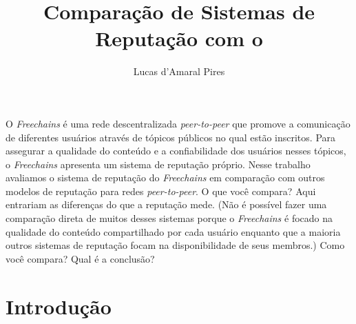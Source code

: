 \documentclass[12pt]{article}
\title{Comparação de Sistemas de Reputação com o \FC}
\author{Lucas d'Amaral Pires\inst{1}}
\newcommand{\FC} {\emph{Freechains}\xspace}
\newcommand{\PtoP} {\emph{peer-to-peer}\xspace}
\begin{document}
 

\maketitle




\begin{resumo} 

O \FC é uma rede descentralizada \PtoP que promove a comunicação de diferentes usuários através de tópicos públicos no qual estão inscritos.
Para assegurar a qualidade do conteúdo e a confiabilidade dos usuários nesses tópicos, o \FC apresenta um sistema de reputação próprio.
Nesse trabalho avaliamos o sistema de reputação do \FC em comparação com outros modelos de reputação para redes \PtoP.
O que você compara? Aqui entrariam as diferenças do que a reputação mede.
(Não é possível fazer uma comparação direta de muitos desses sistemas porque o \FC é focado na qualidade do conteúdo compartilhado por cada usuário enquanto que a maioria outros sistemas de reputação focam na disponibilidade de seus membros.)
Como você compara?
Qual é a conclusão?
  
\end{resumo}


\section{Introdução} \label{sec:intro}

\end{document}
